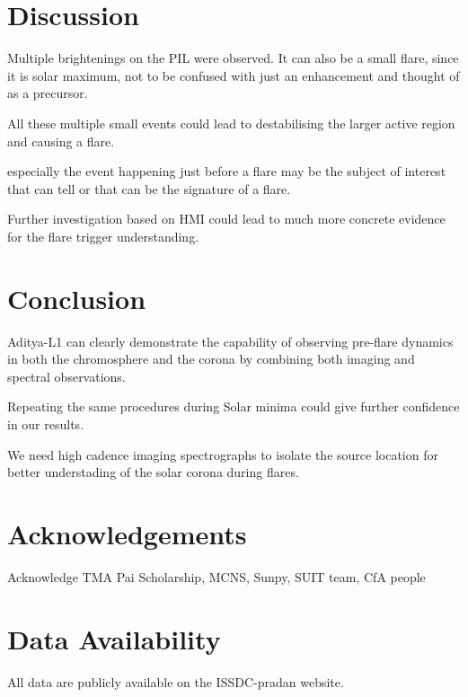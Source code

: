 \documentclass[fleqn,usenatbib]{mnras}
\begin{document}
\section{Discussion}
Multiple brightenings on the PIL were observed. It can also be a small flare, since it is solar maximum, not to be confused with just an enhancement and thought of as a precursor. 

All these multiple small events could lead to destabilising the larger active region and causing a flare.


especially the event happening just before a flare may be the subject of interest that can tell or that can be the signature of a flare.

Further investigation based on HMI could lead to much more concrete evidence for the flare trigger understanding.



\section{Conclusion}

Aditya-L1 can clearly demonstrate the capability of observing pre-flare dynamics in both the chromosphere and the corona by combining both imaging and spectral observations.

Repeating the same procedures during Solar minima could give further confidence in our results.

We need high cadence imaging spectrographs to isolate the source location for better understading of the solar corona during flares.

\section*{Acknowledgements}

Acknowledge TMA Pai Scholarship, MCNS, Sunpy, SUIT team, CfA people

\section*{Data Availability}
All data are publicly available on the ISSDC-pradan website.






\end{document}
